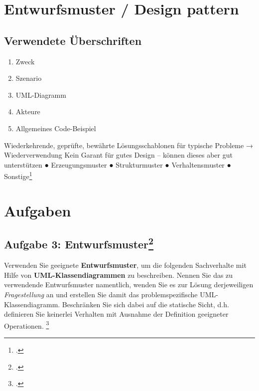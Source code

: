 \documentclass{lehramt-informatik}
\begin{document}

\chapter{Entwurfsmuster / Design pattern}

\begin{quellen}
\item \cite{wiki:entwurfsmuster}
\end{quellen}

\section{Verwendete Überschriften}

\begin{enumerate}
\item Zweck
\item Szenario
\item UML-Diagramm
\item Akteure
\item Allgemeines Code-Beispiel
\end{enumerate}

Wiederkehrende, geprüfte, bewährte Lösungsschablonen für typische Probleme
→ Wiederverwendung
Kein Garant für gutes Design – können dieses aber gut unterstützen
● Erzeugungsmuster
● Strukturmuster
● Verhaltensmuster
● Sonstige\footcite[Seite 39]{sosy:fs:3}


\chapter{Aufgaben}

\section{Aufgabe 3: Entwurfsmuster\footcite{sosy:pu:4}}

Verwenden Sie geeignete \textbf{Entwurfsmuster}, um die folgenden
Sachverhalte mit Hilfe von \textbf{UML-Klassendiagrammen} zu
beschreiben. Nennen Sie das zu verwendende Entwurfsmuster namentlich,
wenden Sie es zur Lösung derjeweiligen \emph{Fragestellung} an und
erstellen Sie damit das problemspezifische UML-Klassendiagramm.
Beschränken Sie sich dabei auf die statische Sicht, d.h. definieren Sie
keinerlei Verhalten mit Ausnahme der Definition geeigneter Operationen.
\footcite{examen:46116:2016:03}
\end{document}
